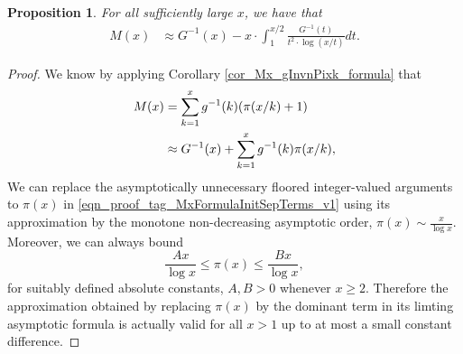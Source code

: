 \documentclass[11pt,reqno,a4letter]{article}
\numberwithin{figure}{section}
\numberwithin{table}{section}
\theoremstyle{plain}
\newtheorem{prop}[theorem]{Proposition}
\numberwithin{theorem}{section}
\theoremstyle{definition}
\begin{document}
\begin{prop}
\label{prop_Mx_SBP_IntegralFormula} 
For all sufficiently large $x$, we have that 
\begin{align} 
\label{eqn_pf_tag_v2-restated_v2} 
M(x) & \approx G^{-1}(x) - x \cdot \int_1^{x/2} \frac{G^{-1}(t)}{t^2 \cdot \log(x/t)} dt. 
\end{align} 
\end{prop} 
\begin{proof} 
We know by applying Corollary \ref{cor_Mx_gInvnPixk_formula} that 
\begin{align} 
\notag
M(x) & = \sum_{k=1}^{x} g^{-1}(k) (\pi(x/k)+1) \\ 
\label{eqn_proof_tag_MxFormulaInitSepTerms_v1} 
     & \approx G^{-1}(x) + \sum_{k=1}^{x} g^{-1}(k) \pi(x/k), 
\end{align} 
We can replace the asymptotically unnecessary floored integer-valued arguments to $\pi(x)$ 
in \eqref{eqn_proof_tag_MxFormulaInitSepTerms_v1} using 
its approximation by the monotone non-decreasing asymptotic order, $\pi(x) \sim \frac{x}{\log x}$. 
Moreover, we can always 
bound $$\frac{Ax}{\log x} \leq \pi(x) \leq \frac{Bx}{\log x},$$ for suitably defined 
absolute constants, $A,B > 0$ whenever $x \geq 2$. 
Therefore the approximation obtained by replacing $\pi(x)$ by the dominant term in its 
limting asymptotic formula is actually valid for all $x > 1$ up to at most 
a small constant difference. 


\end{proof}
\end{document}
